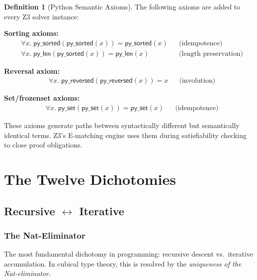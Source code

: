 \documentclass[11pt,a4paper]{report}
\theoremstyle{definition}
\newtheorem{definition}{Definition}[chapter]
\theoremstyle{plain}
\begin{document}
\begin{definition}[Python Semantic Axioms]
\label{def:axioms}
The following axioms are added to every Z3 solver instance:

\textbf{Sorting axioms:}
\begin{align}
  &\forall x.\; \mathsf{py\_sorted}(\mathsf{py\_sorted}(x)) =
    \mathsf{py\_sorted}(x)
    && \text{(idempotence)} \\
  &\forall x.\; \mathsf{py\_len}(\mathsf{py\_sorted}(x)) =
    \mathsf{py\_len}(x)
    && \text{(length preservation)}
\end{align}

\textbf{Reversal axiom:}
\begin{align}
  &\forall x.\; \mathsf{py\_reversed}(\mathsf{py\_reversed}(x)) = x
    && \text{(involution)}
\end{align}

\textbf{Set/frozenset axioms:}
\begin{align}
  &\forall x.\; \mathsf{py\_set}(\mathsf{py\_set}(x)) =
    \mathsf{py\_set}(x)
    && \text{(idempotence)}
\end{align}
\end{definition}

These axioms generate paths between syntactically different but
semantically identical terms.  Z3's E-matching engine uses them during
satisfiability checking to close proof obligations.



\part{The Twelve Dichotomies}

\chapter{Recursive $\leftrightarrow$ Iterative}
\label{ch:rec-iter}

\section{The Nat-Eliminator}

The most fundamental dichotomy in programming: recursive descent vs.\
iterative accumulation.  In cubical type theory, this is resolved by
the \emph{uniqueness of the Nat-eliminator}.
\end{document}
